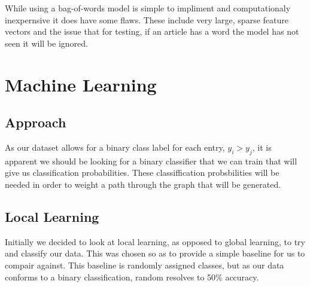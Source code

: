 \documentclass[12pt]{report}
\begin{document}
                While using a bag-of-words model is simple to impliment and computationaly inexpernsive
                it does have some flaws. These include very large, sparse feature vectors and the issue
                that for testing, if an article has a word the model has not seen it will be ignored.
                  
                
                

\chapter{Machine Learning}

\section{Approach}
As our dataset allows for a binary class label for each entry,
$y_{i} > y_{j}$, it is apparent we should be looking for a binary classifier that we can train
that will give us classification probabilities. These classiffication probsbilities
will be needed in order to weight a path through the graph that will be generated.
\section{Local Learning}
Initially we decided to look at local learning, as opposed to global learning,
to try and classify our data. This was chosen so as to provide a
simple baseline for us to compair against. This baseline is
randomly assigned classes, but as our data conforms to a
binary classification, random resolves to 50\% accuracy.
\end{document}
